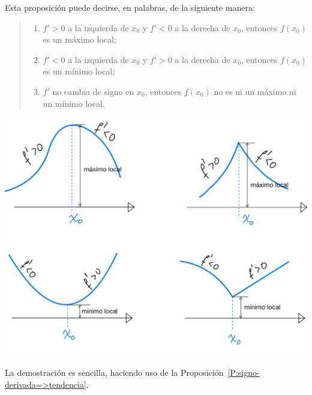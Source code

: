 Esta proposición puede decirse, en palabras, de la siguiente manera:
\begin{quote}
    \begin{enumerate}
        \item $f'>0$ a la izquierda de $x_0$ y $f'<0$ a la derecha de $x_0$, entonces $f(x_0)$ es un máximo local; 
        \item $f'<0$ a la izquierda de $x_0$ y $f'>0$ a la derecha de $x_0$, entonces $f(x_0)$ es un mínimo local; 
        \item $f'$ no cambia de signo en $x_0$, entonces $f(x_0)$ no es ni un máximo ni un mínimo local.
    \end{enumerate}
\end{quote}

\centerline{
\includegraphics[width=.8\textwidth]{pics/max-min-locales-derivada.png}
}
La demostración es sencilla, haciendo uso de la Proposición~\ref{P:signo-derivada=>tendencia}.

